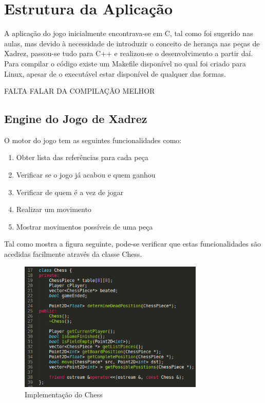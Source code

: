 \documentclass[11pt,a4paper]{report}
\begin{document}
\chapter{Estrutura da Aplicação}

A aplicação do jogo inicialmente encontrava-se em C, tal como foi sugerido nas aulas, mas devido à necessidade de introduzir o conceito de herança nas peças de Xadrez, passou-se tudo para C++ e realizou-se o desenvolvimento a partir daí.\\

Para compilar o código existe um Makefile disponível no qual foi criado para Linux, apesar de o executável estar disponível de qualquer das formas.

FALTA FALAR DA COMPILAÇÃO MELHOR

\section{Engine do Jogo de Xadrez}

O motor do jogo tem as seguintes funcionalidades como:
\begin{enumerate}
\item{Obter lista das referências para cada peça}
\item{Verificar se o jogo já acabou e quem ganhou}
\item{Verificar de quem é a vez de jogar}
\item{Realizar um movimento}
\item{Mostrar movimentos possíveis de uma peça}
\end{enumerate}

Tal como mostra a figura seguinte, pode-se verificar que estas funcionalidades são acedidas facilmente através da classe Chess.

\begin{figure}[H]
\centerline{\includegraphics[width=250pt]{images/chess.png}}
\caption{Implementação do Chess}
\label{img:complete}
\end{figure}
\end{document}
